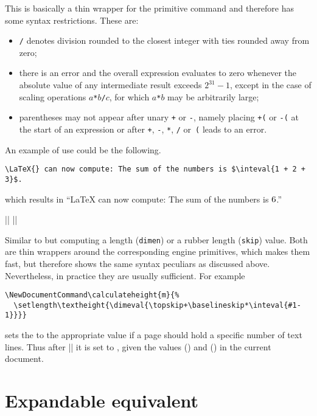 \documentclass{ltxguide}
\begin{document}
  This is basically a thin wrapper for the primitive 
  command and therefore has some syntax restrictions. These are:
  \begin{itemize}
  \item \texttt{/} denotes division rounded to the closest integer with
    ties rounded away from zero;
  \item there is an error and the overall expression evaluates to zero
    whenever the absolute value of any intermediate result exceeds
    $2^{31}-1$, except in the case of scaling operations
    $a$\texttt{*}$b$\texttt{/}$c$, for which $a$\texttt{*}$b$ may be
    arbitrarily large;
  \item parentheses may not appear after unary \texttt{+} or
    \texttt{-}, namely placing \texttt{+(} or \texttt{-(} at the start
    of an expression or after \texttt{+}, \texttt{-}, \texttt{*},
    \texttt{/} or~\texttt{(} leads to an error.
  \end{itemize}

An example of use could be the following.
\begin{verbatim}
\LaTeX{} can now compute: The sum of the numbers is $\inteval{1 + 2 + 3}$.
\end{verbatim}
which results in
\enquote{\LaTeX{} can now compute: The sum of the numbers is $\inteval{1 + 2 + 3}$.}


\begin{decl}
  |\dimeval|  \qquad
  |\skipeval| 
\end{decl}

Similar to  but computing a length (\texttt{dimen}) or a
rubber length (\texttt{skip}) value. Both are thin wrappers around
the corresponding engine primitives, which makes them fast, but
therefore shows the same syntax peculiars as discussed
above. Nevertheless, in practice they are usually sufficient.  For
example
\begin{verbatim}
\NewDocumentCommand\calculateheight{m}{%
  \setlength\textheight{\dimeval{\topskip+\baselineskip*\inteval{#1-1}}}}
\end{verbatim}
sets the  to the appropriate value if a page should
hold a specific number of text lines. Thus after ||
it is set to , given
the values  (\dimeval{\topskip}) and 
(\dimeval{\baselineskip}) in the current document.

\section{Expandable  equivalent}
\end{document}
